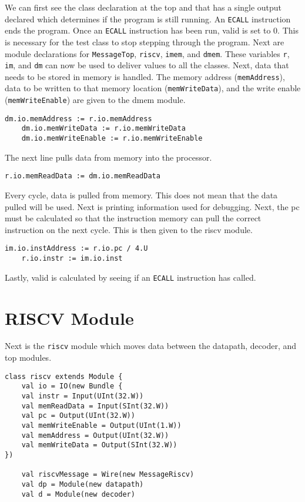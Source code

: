 \documentclass[12pt, letterpaper]{report}
\begin{document}
\noindent We can first see the class declaration at the top and that has
a single output declared which determines if the program is still
running. An \verb|ECALL| instruction ends the program. Once an \verb|ECALL| instruction has been run, valid is set to 0. This is necessary for the test class to stop stepping through the program.
Next are module declarations for \verb|MessageTop|, \verb|riscv|, \verb|imem|, and \verb|dmem|. These variables \verb|r|, \verb|im|, and \verb|dm| can
now be used to deliver values to all the classes. Next, data that needs to be stored in memory is handled. The memory address (\verb|memAddress|), data to be written to that memory location (\verb|memWriteData|), and the write enable (\verb|memWriteEnable|) are given to the dmem module. 

\begin{lstlisting}[style=scala]
    dm.io.memAddress := r.io.memAddress
    dm.io.memWriteData := r.io.memWriteData
    dm.io.memWriteEnable := r.io.memWriteEnable
\end{lstlisting}

\noindent The next line pulls data from memory into the processor.

\begin{lstlisting}[style=scala]
	r.io.memReadData := dm.io.memReadData
\end{lstlisting}

\noindent Every cycle, data is pulled from memory. This does not mean that the data pulled will be used. Next is printing information used for debugging. Next, the pc must be calculated so that the instruction memory can pull the correct instruction on the next cycle. This is then given to the riscv module.
\begin{lstlisting}[style=scala]
	im.io.instAddress := r.io.pc / 4.U
	r.io.instr := im.io.inst
\end{lstlisting}

\noindent Lastly, valid is calculated by seeing if an \verb|ECALL| instruction has called.


\section{RISCV Module}
Next is the \verb|riscv| module which moves data between the datapath, decoder, and top modules. 



\begin{lstlisting}[style=scala]
class riscv extends Module {
    val io = IO(new Bundle {
    val instr = Input(UInt(32.W))
    val memReadData = Input(SInt(32.W))
    val pc = Output(UInt(32.W))
    val memWriteEnable = Output(UInt(1.W))
    val memAddress = Output(UInt(32.W))
    val memWriteData = Output(SInt(32.W))
})
    
    val riscvMessage = Wire(new MessageRiscv)
    val dp = Module(new datapath)
    val d = Module(new decoder)
\end{lstlisting}
\end{document}
